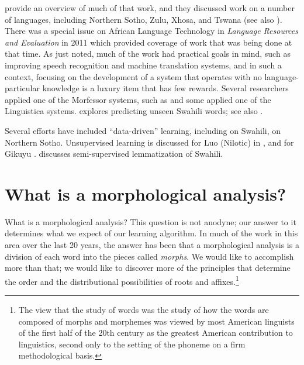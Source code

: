 \documentclass[output=paper,colorlinks,citecolor=brown]{langscibook}
\begin{document}
\citet{DePauwDeSchryver2008} provide an overview of much of that work, and they discussed work on a number of languages, including Northern Sotho, Zulu, Xhosa, and Tswana (see also \citealt{DePauwEtAl2009}). There was a special issue on African Language Technology in \textit{Language Resources and Evaluation} in 2011 which provided coverage of work that was being done at that time.  As just noted, much of the work had practical goals in mind, such as improving speech recognition \citep{GelasEtAl2012} and machine translation systems, and in such a context, focusing on the development of a system that operates with no language-particular knowledge is a luxury item that has few rewards. Several researchers applied one of the Morfessor systems, such as \citet{GelasEtAl2012} and some applied one of the Linguistica systems.  \citet{Linden2008} explores predicting unseen Swahili words; see also \citet{Muhirwe2007}.

 


Several efforts have included ``data-driven'' learning, including  \citet{DePauwEtAl2006} on Swahili, \citet{DeSchryverDePauw2007} on  Northern Sotho. Unsupervised learning is discussed for  Luo (Nilotic) in \citet{DePauw2010},  and for Gikuyu \citep{DePauwWagacha2007}. \citet{Linden2008} discusses semi-supervised lemmatization of Swahili.
   

\section{What is a morphological analysis?}

What is a morphological analysis? This question is not anodyne; our answer to it determines what we expect of our learning algorithm. In much of the work in this area over the last 20 years, the answer has been that a morphological analysis is a division of each word into the pieces called \textit{morphs}. We would like to accomplish more than that; we would like to discover more of the principles that determine the order and the distributional possibilities of roots and affixes.\footnote{The view that the study of words was the study of how the words are composed of morphs and morphemes was viewed by most American linguists of the first half of the 20th century as the greatest American contribution to linguistics, second only to the setting of the phoneme on a firm methodological basis.}  
\end{document}
